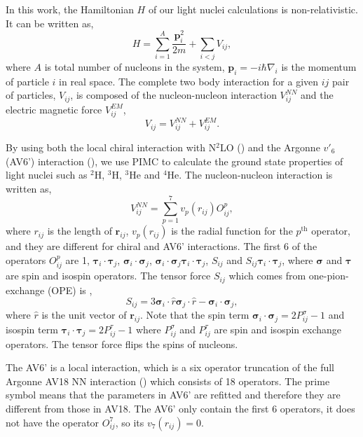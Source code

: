 \documentclass[12pt,letterpaper,UTF8]{report}
\begin{document}
In this work, the Hamiltonian $H$ of our light nuclei calculations is non-relativistic. It can be written as,
\begin{equation}
H = \sum_{i=1}^A \frac{\bm{p}_i^2}{2m}  + \sum_{i<j}V_{ij}, \label{PIMCHamilton}
\end{equation}
where $A$ is total number of nucleons in the system, $\bm{p}_i=-i\hbar \nabla_i$ is the momentum of particle $i$ in real space.
The complete two body interaction for a given $ij$ pair of particles, $V_{ij}$, is composed of the nucleon-nucleon interaction $V^{NN}_{ij}$ and the electric magnetic force $V^{EM}_{ij}$,
\begin{equation}
V_{ij}=V_{ij}^{NN}+V^{EM}_{ij}.\label{Vij}
\end{equation}

By using both the local chiral interaction with N$^2$LO (\cite{Gerzerlis14a,Lynn2017PRC,Lonardoni2018PRC}) and the Argonne $v'_6$ (AV6') interaction  (\cite{WiringaPieper02a}), we use PIMC to calculate the ground state properties of light nuclei such as $^2$H, $^3$H, $^3$He and $^4$He.
The nucleon-nucleon interaction is written as,
\begin{equation}
V^{NN}_{ij}=\sum_{p=1}^7 v_p(r_{ij}) O_{ij}^p , \label{AV6'}
\end{equation}
where $r_{ij}$ is the length of $\bm{r}_{ij}$, $v_p(r_{ij})$ is the radial function for the $p^{\text{th}}$ operator, and they are different for chiral and AV6' interactions. The first 6 of the operators $O_{ij}^p$ are 1, $\bm{\tau}_i \cdot \bm{\tau}_j$, $\bm{\sigma}_i \cdot \bm{\sigma}_j$, $\bm{\sigma}_i \cdot \bm{\sigma}_j \bm{\tau}_i \cdot \bm{\tau}_j$, $S_{ij}$ and $S_{ij} \bm{\tau}_i \cdot \bm{\tau}_j$, where $\bm{\sigma}$ and $\bm{\tau}$ are spin and isospin operators.
The tensor force $S_{ij}$ which comes from one-pion-exchange (OPE) is ,
\begin{equation}
S_{ij}=3 \bm{\sigma}_i \cdot \hat{r} \bm{\sigma}_j \cdot \hat{r} - \bm{\sigma}_i \cdot \bm{\sigma}_j , \label{AV6'O}
\end{equation}
where $\hat{r}$ is the unit vector of $\bm{r}_{ij}$. Note that the spin term $\bm{\sigma}_i \cdot \bm{\sigma}_j = 2P_{ij}^{\sigma} -1 $ and isospin term $\bm{\tau}_i \cdot \bm{\tau}_j = 2P_{ij}^{\tau} -1 $ where $P_{ij}^{\sigma}$ and $P_{ij}^{\tau}$ are spin and isospin exchange operators. The tensor force flips the spins of nucleons.

The AV6' is a local interaction, which is a six operator truncation of the full Argonne AV18 NN interaction (\cite{Wiringa95PRC}) which consists of 18 operators.
The prime symbol means that the parameters in AV6' are refitted and therefore they are different from those in AV18.
The AV6' only contain the first 6 operators, it does not have the  operator $O_{ij}^7$, so its $v_7(r_{ij})=0$.
\end{document}
